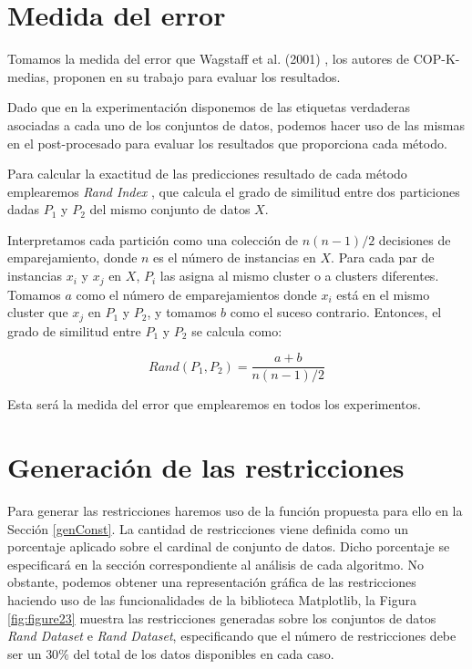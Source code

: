 \section{Medida del error}

Tomamos la medida del error que Wagstaff et al. (2001) \cite{Wagstaff:2001b}, los autores de COP-K-medias, proponen en su trabajo para evaluar los resultados.

Dado que en la experimentación disponemos de las etiquetas verdaderas asociadas a cada uno de los conjuntos de datos, podemos hacer uso de las mismas en el post-procesado para evaluar los resultados que proporciona cada método.

Para calcular la exactitud de las predicciones resultado de cada método emplearemos \textit{Rand Index} \cite{Rand:1971}, que calcula el grado de similitud entre dos particiones dadas $P_1$ y $P_2$ del mismo conjunto de datos $X$.

Interpretamos cada partición como una colección de $n (n-1) / 2$ decisiones de emparejamiento, donde $n$ es el número de instancias en $X$. Para cada par de instancias $x_i$ y $x_j$ en $X$, $P_i$ las asigna al mismo cluster o a clusters diferentes. Tomamos $a$ como el número de emparejamientos donde $x_i$ está en el mismo cluster que $x_j$ en $P_1$ y $P_2$, y tomamos $b$ como el suceso contrario. Entonces, el grado de similitud entre $P_1$ y $P_2$ se calcula como:

\begin{equation}
Rand(P_1, P_2) = \frac{a + b}{n (n-1) / 2}
\label{eqn70}
\end{equation}

Esta será la medida del error que emplearemos en todos los experimentos.

\section{Generación de las restricciones}

Para generar las restricciones haremos uso de la función propuesta para ello en la Sección \ref{genConst}. La cantidad de restricciones viene definida como un porcentaje aplicado sobre el cardinal de conjunto de datos. Dicho porcentaje se especificará en la sección correspondiente al análisis de cada algoritmo. No obstante, podemos obtener una representación gráfica de las restricciones haciendo uso de las funcionalidades de la biblioteca Matplotlib, la Figura \ref{fig:figure23} muestra las restricciones generadas sobre los conjuntos de datos \textit{Rand Dataset} e \textit{Rand Dataset}, especificando que el número de restricciones debe ser un $30\%$ del total de los datos disponibles en cada caso.

